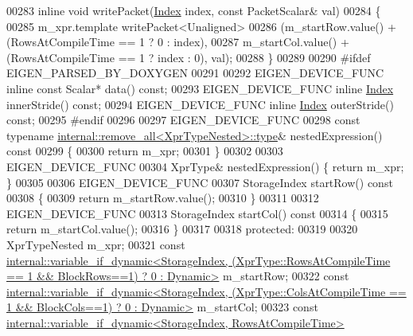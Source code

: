 \begin{DoxyCode}
00283     \textcolor{keyword}{inline} \textcolor{keywordtype}{void} writePacket(\hyperlink{namespace_eigen_a62e77e0933482dafde8fe197d9a2cfde}{Index} index, \textcolor{keyword}{const} PacketScalar& val)
00284     \{
00285       m\_xpr.template writePacket<Unaligned>
00286          (m\_startRow.value() + (RowsAtCompileTime == 1 ? 0 : index),
00287           m\_startCol.value() + (RowsAtCompileTime == 1 ? index : 0), val);
00288     \}
00289 
00290 \textcolor{preprocessor}{    #ifdef EIGEN\_PARSED\_BY\_DOXYGEN}
00291 
00292     EIGEN\_DEVICE\_FUNC \textcolor{keyword}{inline} \textcolor{keyword}{const} Scalar* data() \textcolor{keyword}{const};
00293     EIGEN\_DEVICE\_FUNC \textcolor{keyword}{inline} \hyperlink{namespace_eigen_a62e77e0933482dafde8fe197d9a2cfde}{Index} innerStride() \textcolor{keyword}{const};
00294     EIGEN\_DEVICE\_FUNC \textcolor{keyword}{inline} \hyperlink{namespace_eigen_a62e77e0933482dafde8fe197d9a2cfde}{Index} outerStride() \textcolor{keyword}{const};
00295 \textcolor{preprocessor}{    #endif}
00296 
00297     EIGEN\_DEVICE\_FUNC
00298     \textcolor{keyword}{const} \textcolor{keyword}{typename} \hyperlink{group___sparse_core___module}{internal::remove\_all<XprTypeNested>::type}& 
      nestedExpression()\textcolor{keyword}{ const}
00299 \textcolor{keyword}{    }\{ 
00300       \textcolor{keywordflow}{return} m\_xpr; 
00301     \}
00302 
00303     EIGEN\_DEVICE\_FUNC
00304     XprType& nestedExpression() \{ \textcolor{keywordflow}{return} m\_xpr; \}
00305       
00306     EIGEN\_DEVICE\_FUNC
00307     StorageIndex startRow()\textcolor{keyword}{ const}
00308 \textcolor{keyword}{    }\{ 
00309       \textcolor{keywordflow}{return} m\_startRow.value(); 
00310     \}
00311       
00312     EIGEN\_DEVICE\_FUNC
00313     StorageIndex startCol()\textcolor{keyword}{ const}
00314 \textcolor{keyword}{    }\{ 
00315       \textcolor{keywordflow}{return} m\_startCol.value(); 
00316     \}
00317 
00318   \textcolor{keyword}{protected}:
00319 
00320     XprTypeNested m\_xpr;
00321     \textcolor{keyword}{const} 
      \hyperlink{class_eigen_1_1internal_1_1variable__if__dynamic}{internal::variable\_if\_dynamic<StorageIndex, (XprType::RowsAtCompileTime == 1 && BlockRows==1) ? 0 :
       Dynamic>}
       m\_startRow;
00322     \textcolor{keyword}{const} 
      \hyperlink{class_eigen_1_1internal_1_1variable__if__dynamic}{internal::variable\_if\_dynamic<StorageIndex, (XprType::ColsAtCompileTime == 1 && BlockCols==1) ? 0 :
       Dynamic>}
       m\_startCol;
00323     \textcolor{keyword}{const} \hyperlink{class_eigen_1_1internal_1_1variable__if__dynamic}{internal::variable\_if\_dynamic<StorageIndex, RowsAtCompileTime>}

\end{DoxyCode}
